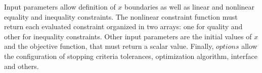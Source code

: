 Input parameters allow definition of $x$ boundaries as well as linear and nonlinear equality and inequality constraints. The nonlinear constraint function must return each evaluated constraint organized in two arrays: one for quality and other for inequality constraints. Other input parameters are the initial values of $x$ and the objective function, that must return a scalar value. Finally, $options$ allow the configuration of stopping criteria tolerances, optimization algorithm, interface and others.


%
%
%
%
%
 


